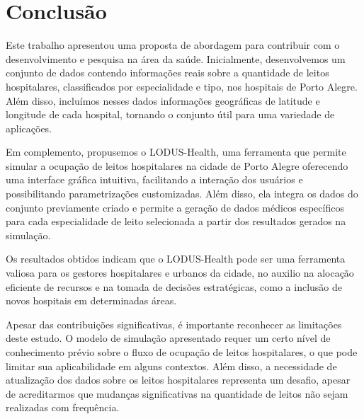 \chapter{Conclusão} \label{cpt:conclus}
Este trabalho apresentou uma proposta de abordagem para contribuir com o desenvolvimento e pesquisa na área da saúde. Inicialmente, desenvolvemos um conjunto de dados contendo informações reais sobre a quantidade de leitos hospitalares, classificados por especialidade e tipo, nos hospitais de Porto Alegre. Além disso, incluímos nesses dados informações geográficas de latitude e longitude de cada hospital, tornando o conjunto útil para uma variedade de aplicações.

Em complemento, propusemos o LODUS-Health, uma ferramenta que permite simular a ocupação de leitos hospitalares na cidade de Porto Alegre oferecendo uma interface gráfica intuitiva, facilitando a interação dos usuários e possibilitando parametrizações customizadas. Além disso, ela integra os dados do conjunto previamente criado e permite a geração de dados médicos específicos para cada especialidade de leito selecionada a partir dos resultados gerados na simulação.

Os resultados obtidos indicam que o LODUS-Health pode ser uma ferramenta valiosa para os gestores hospitalares e urbanos da cidade, no auxilio na alocação eficiente de recursos e na tomada de decisões estratégicas, como a inclusão de novos hospitais em determinadas áreas.

Apesar das contribuições significativas, é importante reconhecer as limitações deste estudo. O modelo de simulação apresentado requer um certo nível de conhecimento prévio sobre o fluxo de ocupação de leitos hospitalares, o que pode limitar sua aplicabilidade em alguns contextos. Além disso, a necessidade de atualização dos dados sobre os leitos hospitalares representa um desafio, apesar de acreditarmos que mudanças significativas na quantidade de leitos não sejam realizadas com frequência.